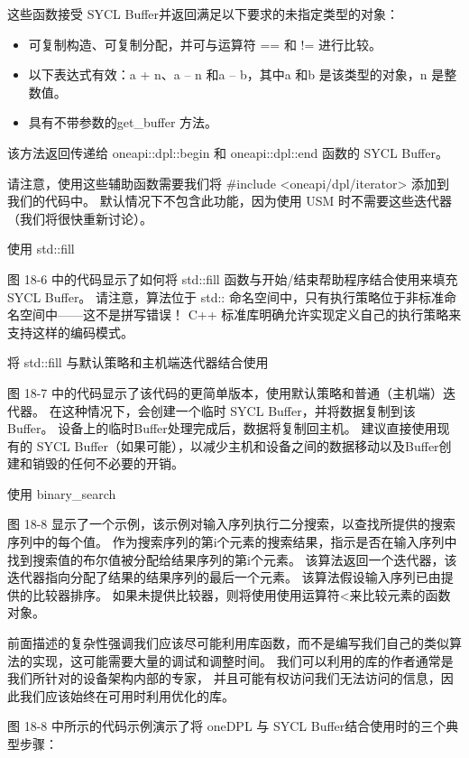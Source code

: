 这些函数接受 SYCL Buffer并返回满足以下要求的未指定类型的对象：

\begin{itemize}
	\item 可复制构造、可复制分配，并可与运算符 == 和 != 进行比较。

	\item 以下表达式有效：a + n、a – n 和a – b，其中a 和b 是该类型的对象，n 是整数值。

	\item 具有不带参数的get\_buffer 方法。
\end{itemize}

该方法返回传递给 oneapi::dpl::begin 和 oneapi::dpl::end 函数的 SYCL Buffer。

请注意，使用这些辅助函数需要我们将 \#include <oneapi/dpl/iterator> 添加到我们的代码中。 
默认情况下不包含此功能，因为使用 USM 时不需要这些迭代器（我们将很快重新讨论）。

{\color{red} 使用 std::fill}

图 18-6 中的代码显示了如何将 std::fill 函数与开始/结束帮助程序结合使用来填充 SYCL Buffer。 
请注意，算法位于 std:: 命名空间中，只有执行策略位于非标准命名空间中——这不是拼写错误！ 
C++ 标准库明确允许实现定义自己的执行策略来支持这样的编码模式。

{\color{red} 将 std::fill 与默认策略和主机端迭代器结合使用}

图 18-7 中的代码显示了该代码的更简单版本，使用默认策略和普通（主机端）迭代器。 
在这种情况下，会创建一个临时 SYCL Buffer，并将数据复制到该Buffer。 
设备上的临时Buffer处理完成后，数据将复制回主机。 
建议直接使用现有的 SYCL Buffer（如果可能），以减少主机和设备之间的数据移动以及Buffer创建和销毁的任何不必要的开销。

{\color{red} 使用 binary\_search}

图 18-8 显示了一个示例，该示例对输入序列执行二分搜索，以查找所提供的搜索序列中的每个值。 
作为搜索序列的第i个元素的搜索结果，指示是否在输入序列中找到搜索值的布尔值被分配给结果序列的第i个元素。 
该算法返回一个迭代器，该迭代器指向分配了结果的结果序列的最后一个元素。 
该算法假设输入序列已由提供的比较器排序。 如果未提供比较器，则将使用使用运算符<来比较元素的函数对象。

前面描述的复杂性强调我们应该尽可能利用库函数，而不是编写我们自己的类似算法的实现，这可能需要大量的调试和调整时间。 
我们可以利用的库的作者通常是我们所针对的设备架构内部的专家，
并且可能有权访问我们无法访问的信息，因此我们应该始终在可用时利用优化的库。

图 18-8 中所示的代码示例演示了将 oneDPL 与 SYCL Buffer结合使用时的三个典型步骤：

